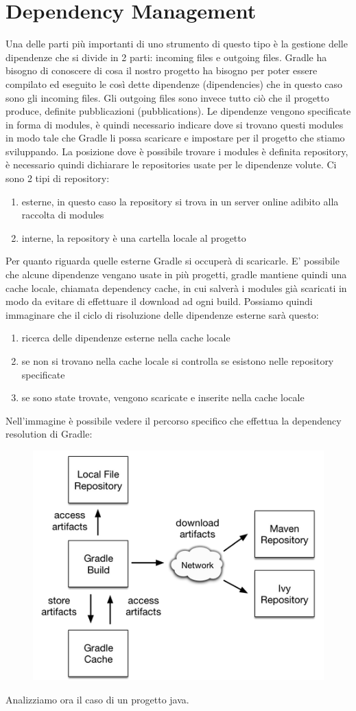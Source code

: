 \section{Dependency Management}
Una delle parti più importanti di uno strumento di questo tipo è la gestione delle dipendenze che si divide in 2 parti: incoming files e outgoing files. Gradle ha bisogno di conoscere di cosa il nostro progetto ha bisogno per poter essere compilato ed eseguito le così dette dipendenze (dipendencies) che in questo caso sono gli incoming files. Gli outgoing files sono invece tutto ciò che il progetto produce, definite pubblicazioni (pubblications). Le dipendenze vengono specificate in forma di modules, è quindi necessario indicare dove si trovano questi modules in modo tale che Gradle li possa scaricare e impostare per il progetto che stiamo sviluppando. La posizione dove è possibile trovare i modules è definita repository, è necessario quindi dichiarare le repositories usate per le dipendenze volute. Ci sono 2 tipi di repository: 
\begin{enumerate}
    \item esterne, in questo caso la repository si trova in un server online adibito alla raccolta di modules
    \item interne, la repository è una cartella locale al progetto
\end{enumerate}
Per quanto riguarda quelle esterne Gradle si occuperà di scaricarle. E' possibile che alcune dipendenze vengano usate in più progetti, gradle mantiene quindi una cache locale, chiamata dependency cache, in cui salverà i modules già scaricati in modo da evitare di effettuare il download ad ogni build. Possiamo quindi immaginare che il ciclo di risoluzione delle dipendenze esterne sarà questo:
\begin{enumerate}
    \item ricerca delle dipendenze esterne nella cache locale
    \item se non si trovano nella cache locale si controlla se esistono nelle repository specificate
    \item se sono state trovate, vengono scaricate e inserite nella cache locale
\end{enumerate}
Nell'immagine è possibile vedere il percorso specifico che effettua la dependency resolution di Gradle:
\begin{figure}[H]
\centering
\includegraphics[width=0.4\linewidth]{3DependencyManagement/depMan.png}
\end{figure}
Analizziamo ora il caso di un progetto java.

